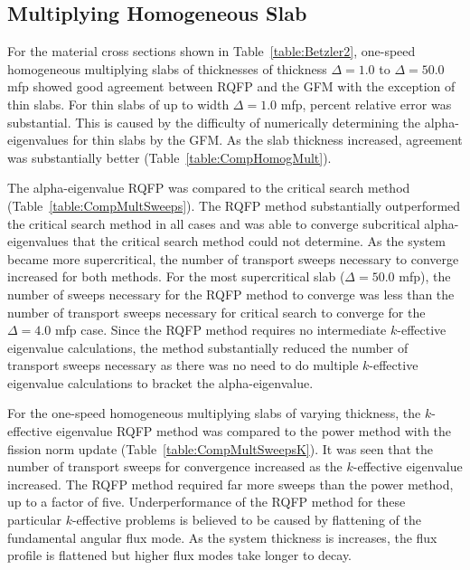 \subsection{Multiplying Homogeneous Slab}

For the material cross sections shown in Table~\ref{table:Betzler2}, one-speed homogeneous multiplying slabs of thicknesses of thickness $\Delta = 1.0$ to $\Delta = 50.0$ mfp showed good agreement between RQFP and the GFM with the exception of thin slabs. For thin slabs of up to width $\Delta = 1.0$ mfp, percent relative error was substantial. This is caused by the difficulty of numerically determining the alpha-eigenvalues for thin slabs by the GFM. As the slab thickness increased, agreement was substantially better (Table~\ref{table:CompHomogMult}). 

The alpha-eigenvalue RQFP was compared to the critical search method (Table~\ref{table:CompMultSweeps}). The RQFP method substantially outperformed the critical search method in all cases and was able to converge subcritical alpha-eigenvalues that the critical search method could not determine. As the system became more supercritical, the number of transport sweeps necessary to converge increased for both methods. For the most supercritical slab ($\Delta = 50.0$ mfp), the number of sweeps necessary for the RQFP method to converge was less than the number of transport sweeps necessary for critical search to converge for the $\Delta = 4.0$ mfp case. Since the RQFP method requires no intermediate $k$-effective eigenvalue calculations, the method substantially reduced the number of transport sweeps necessary as there was no need to do multiple $k$-effective eigenvalue calculations to bracket the alpha-eigenvalue.

For the one-speed homogeneous multiplying slabs of varying thickness, the $k$-effective eigenvalue RQFP method was compared to the power method with the fission norm update (Table~\ref{table:CompMultSweepsK}). It was seen that the number of transport sweeps for convergence increased as the $k$-effective eigenvalue increased. The RQFP method required far more sweeps than the power method, up to a factor of five. Underperformance of the RQFP method for these particular $k$-effective problems is believed to be caused by flattening of the fundamental angular flux mode. As the system thickness is increases, the flux profile is flattened but higher flux modes take longer to decay.

